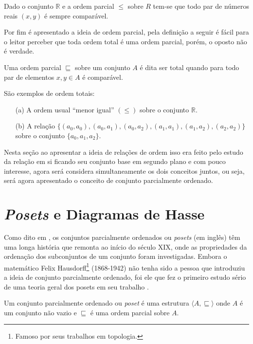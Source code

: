 \begin{example}
	Dado o conjunto $\mathbb{R}$ e a ordem parcial $\leq$ sobre $R$ tem-se que todo par de números reais $(x, y)$ é sempre comparável.
\end{example}

Por fim é apresentado a ideia de ordem parcial, pela definição a seguir é fácil para o leitor perceber que toda ordem total é uma ordem parcial, porém, o oposto não é verdade.

\begin{definition}
	Uma ordem parcial $\sqsubseteq$ sobre um conjunto $A$ é dita ser total quando para todo par de elementos $x, y \in A$ é comparável.
\end{definition}

\begin{example}
	São exemplos de ordem totais:
	\begin{itemize}
		\item[(a)] A ordem usual ``menor igual'' $(\leq)$ sobre o conjunto $\mathbb{R}$.
		\item[(b)] A relação $\{(a_0, a_0), (a_0, a_1), (a_0, a_2), (a_1, a_1), (a_1, a_2), (a_2, a_2)\}$ sobre o conjunto $\{a_0, a_1, a_2\}$.
	\end{itemize}
\end{example}

Nesta seção ao apresentar a ideia de relações de ordem isso era feito pelo estudo da relação em si ficando seu conjunto base em segundo plano e com pouco interesse, agora será considera simultaneamente os dois conceitos juntos, ou seja, será agora apresentado o conceito de conjunto parcialmente ordenado.

\section{\textit{Posets} e Diagramas de Hasse}\label{sec:Poset}

Como dito em \cite{neggers1998poset},  os conjuntos parcialmente ordenados ou \textit{posets} (em inglês) têm uma longa história que remonta ao início do século XIX, onde as propriedades da ordenação dos subconjuntos de um conjunto foram investigadas.  Embora o matemático Felix Hausdorff\footnote{Famoso por seus trabalhos em topologia.} (1868-1942) não tenha sido a pessoa que introduziu a ideia de conjunto parcialmente ordenado, foi ele que fez o primeiro estudo sério de uma teoria geral dos posets em seu trabalho \cite{hausdorff1914poset}. 

\begin{definition}[Poset]
	Um conjunto parcialmente ordenado ou \textit{poset} é uma estrutura $\langle A, \sqsubseteq \rangle$ onde $A$ é um conjunto não vazio e $\sqsubseteq$ é uma ordem parcial sobre $A$.
\end{definition}

